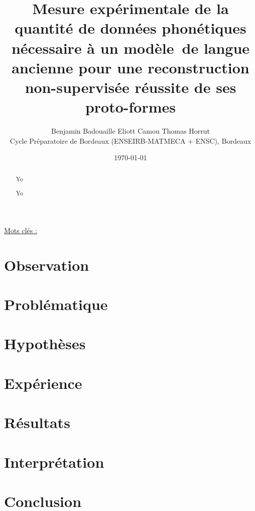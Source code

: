 \documentclass[11pt, french]{article}
\title{Mesure expérimentale de la quantité de données phonétiques nécessaire à un modèle\
de langue ancienne pour une reconstruction non-supervisée réussite de ses proto-formes}
\author{Benjamin Badouaille \qquad Eliott Camou \qquad Thomas Horrut \\
    Cycle Préparatoire de Bordeaux (ENSEIRB-MATMECA + ENSC), Bordeaux}
\date{\today}
\begin{document}
\maketitle
\begin{abstract}
    Yo
\end{abstract}
\underline{Mots clés :}
\begin{abstract}
  Yo
\end{abstract}
\renewcommand*\contentsname{Sommaire}
\tableofcontents

\section{Observation}

\blindtext


\section{Problématique}

\section{Hypothèses}

\section{Expérience}

\section{Résultats}

\section{Interprétation}
\section{Conclusion}
\end{document}
